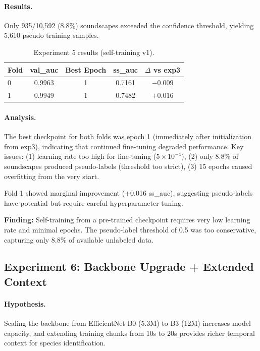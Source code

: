 \paragraph{Results.}
Only 935/10,592 (8.8\%) soundscapes exceeded the confidence threshold,
yielding 5,610 pseudo training samples.

\begin{table}[h]
\centering
\caption{Experiment 5 results (self-training v1).}
\label{tab:exp5}
\begin{tabular}{lcccc}
\hline
\textbf{Fold} & \textbf{val\_auc} & \textbf{Best Epoch} & \textbf{ss\_auc} & \textbf{$\Delta$ vs exp3} \\
\hline
0 & 0.9963 & 1 & 0.7161 & $-0.009$ \\
1 & 0.9949 & 1 & 0.7482 & $+0.016$ \\
\hline
\end{tabular}
\end{table}

\paragraph{Analysis.}
The best checkpoint for both folds was epoch 1 (immediately after initialization
from exp3), indicating that continued fine-tuning degraded performance.
Key issues: (1) learning rate too high for fine-tuning ($5 \times 10^{-4}$),
(2) only 8.8\% of soundscapes produced pseudo-labels (threshold too strict),
(3) 15 epochs caused overfitting from the very start.

Fold 1 showed marginal improvement (+0.016 ss\_auc), suggesting pseudo-labels
have potential but require careful hyperparameter tuning.

\textbf{Finding:} Self-training from a pre-trained checkpoint requires very low
learning rate and minimal epochs. The pseudo-label threshold of 0.5 was too
conservative, capturing only 8.8\% of available unlabeled data.

\subsection{Experiment 6: Backbone Upgrade + Extended Context}
\label{sec:exp6}

\paragraph{Hypothesis.}
Scaling the backbone from EfficientNet-B0 (5.3M) to B3 (12M) increases model
capacity, and extending training chunks from 10s to 20s provides richer
temporal context for species identification.

